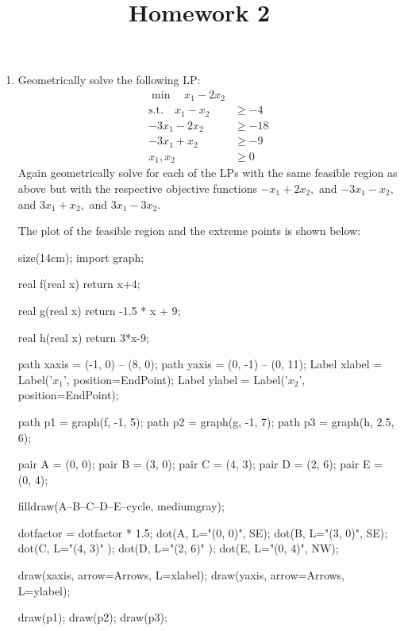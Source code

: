\documentclass{article}
\begin{document}
\title{Homework 2}
\maketitle
\thispagestyle{fancy}

\begin{enumerate}
	\item Geometrically solve the following LP:
		\begin{align*}
			\min \quad x_1-2x_2 & \\
			\text{s.t.}\quad x_1-x_2&\ge -4 \\
			-3x_1-2x_2&\ge -18 \\
			-3x_1+x_2&\ge-9 \\
			x_1, x_2 &\ge 0
		\end{align*}
		Again geometrically solve for each of the LPs with the same feasible region as above but with the respective objective functions $-x_1+2x_2,$ and $-3x_1-x_2,$ and $3x_1+x_2,$ and $3x_1-3x_2.$ 
		\begin{soln}
			The plot of the feasible region and the extreme points is shown below:
			\begin{center}
				\begin{asy}
					size(14cm);
					import graph;

					real f(real x) {
						return x+4;
					}

					real g(real x) {
						return -1.5 * x + 9;
					}

					real h(real x) {
						return 3*x-9;
					}

					path xaxis = (-1, 0) -- (8, 0);
					path yaxis = (0, -1) -- (0, 11);
					Label xlabel = Label('$x_1$', position=EndPoint);
					Label ylabel = Label('$x_2$', position=EndPoint);

					path p1 = graph(f, -1, 5);
					path p2 = graph(g, -1, 7);
					path p3 = graph(h, 2.5, 6);

					pair A = (0, 0);
					pair B = (3, 0);
					pair C = (4, 3);
					pair D = (2, 6);
					pair E = (0, 4);

					filldraw(A--B--C--D--E--cycle, mediumgray);

					dotfactor = dotfactor * 1.5;
					dot(A, L="(0, 0)", SE);
					dot(B, L="(3, 0)", SE);
					dot(C, L="(4, 3)" );
					dot(D, L="(2, 6)" );
					dot(E, L="(0, 4)", NW);

					draw(xaxis, arrow=Arrows, L=xlabel);
					draw(yaxis, arrow=Arrows, L=ylabel);

					draw(p1);
					draw(p2);
					draw(p3);


\end{asy}
\end{center}
\end{soln}
\end{enumerate}
\end{document}
